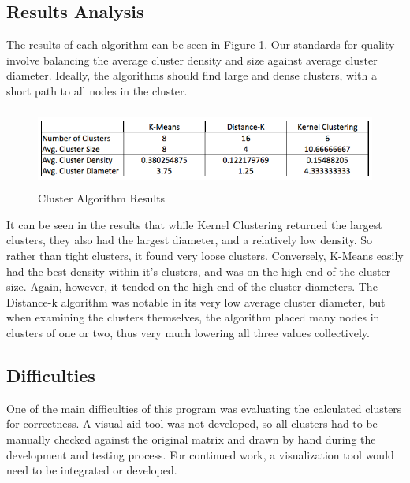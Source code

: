 \documentclass[12pt]{article}
\begin{document}
\subsection{Results Analysis}
The results of each algorithm can be seen in Figure \ref{results_data}. Our standards for quality involve balancing the average cluster density and size against average cluster diameter. Ideally, the algorithms should find large and dense clusters, with a short path to all nodes in the cluster.

\begin{figure}[!htb]
\begin{center}
	\includegraphics[height=7em]{data.png}
	\caption{Cluster Algorithm Results}
	\label{results_data}
\end{center}
\end{figure}

It can be seen in the results that while Kernel Clustering returned the largest clusters, they also had the largest diameter, and a relatively low density. So rather than tight clusters, it found very loose clusters. Conversely, K-Means easily had the best density within it's clusters, and was on the high end of the cluster size. Again, however, it tended on the high end of the cluster diameters.
\newline\newline
The Distance-k algorithm was notable in its very low average cluster diameter, but when examining the clusters themselves, the algorithm placed many nodes in clusters of one or two, thus very much lowering all three values collectively.

\subsection{Difficulties}
One of the main difficulties of this program was evaluating the calculated clusters for correctness. A visual aid tool was not developed, so all clusters had to be manually checked against the original matrix and drawn by hand during the development and testing process. For continued work, a visualization tool would need to be integrated or developed.

\newpage
\appendix
\appendixpage
\addappheadtotoc
\end{document}
